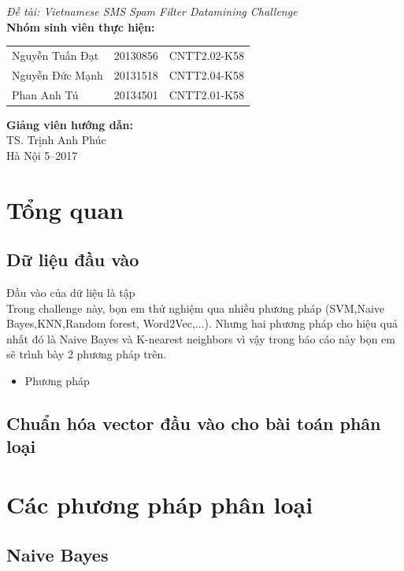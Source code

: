 \documentclass[a4paper,12pt]{report}
\renewcommand{\contentsname}{Mục lục}
\begin{document}
\begin{center}
{\fontsize{18}{20}\selectfont \emph{Đề tài:  Vietnamese SMS Spam Filter Datamining Challenge }}\\[2cm]
\hspace{-5cm}\fontsize{14}{16}\selectfont \textbf{Nhóm sinh viên thực hiện:}\\[0.1cm] 
\begin{longtable}{l c c}
Nguyễn Tuấn Đạt & 20130856 & CNTT2.02-K58 \\
Nguyễn Đức Mạnh & 20131518 & CNTT2.04-K58\\
Phan Anh Tú &   20134501 & CNTT2.01-K58\\
\end{longtable}

\hspace{-6cm}\fontsize{14}{16}\selectfont \textbf{Giảng viên hướng dẫn:}\\[0.1cm]
\hspace{-2.7cm}\fontsize{14}{16}\selectfont TS. Trịnh Anh Phúc \\[3.0cm]
\fontsize{16}{19}\selectfont Hà Nội 5--2017
\end{center}
\newpage
\pdfbookmark{\contentsname}{toc}
\tableofcontents
\listoffigures
\chapter{Tổng quan}
\section{Dữ liệu đầu vào}
Đầu vào của dữ liệu là tập \\
Trong challenge này, bọn em thử nghiệm qua nhiều phương pháp (SVM,Naive Bayes,KNN,Random forest, Word2Vec,...). Nhưng hai phương pháp cho hiệu quả nhất đó là Naive Bayes và K-nearest neighbors vì vậy trong báo cáo này bọn em sẽ trình bày 2 phương pháp trên.
\begin{itemize}
\item Phương pháp
\end{itemize}
\section{Chuẩn hóa vector đầu vào cho bài toán phân loại}
\chapter{Các phương pháp phân loại}
\section{Naive Bayes}
\end{document}
